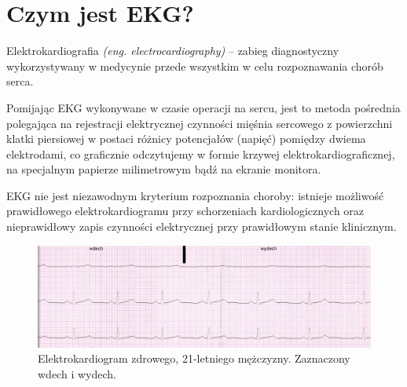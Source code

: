 \documentclass[12pt,a4paper]{article}
\begin{document}
\section{Czym jest EKG?}
Elektrokardiografia \cite{1}  \textit{(eng. electrocardiography)} – zabieg diagnostyczny wykorzystywany w medycynie przede wszystkim w celu rozpoznawania chorób serca.

Pomijając EKG wykonywane w czasie operacji na sercu, jest to metoda pośrednia polegająca na rejestracji elektrycznej czynności mięśnia sercowego z powierzchni klatki piersiowej w postaci różnicy potencjałów (napięć) pomiędzy dwiema elektrodami, co graficznie odczytujemy w formie krzywej elektrokardiograficznej, na specjalnym papierze milimetrowym bądź na ekranie monitora.

EKG nie jest niezawodnym kryterium rozpoznania choroby: istnieje możliwość prawidłowego elektrokardiogramu przy schorzeniach kardiologicznych oraz nieprawidłowy zapis czynności elektrycznej przy prawidłowym stanie klinicznym. 

\begin{figure}[H]
    \centering
    \includegraphics[width=1\linewidth]{EKG-image.jpg}
    \caption{Elektrokardiogram zdrowego, 21-letniego mężczyzny. Zaznaczony wdech i wydech. \cite{2}}
    \label{fig:ekg}
\end{figure}
\end{document}
